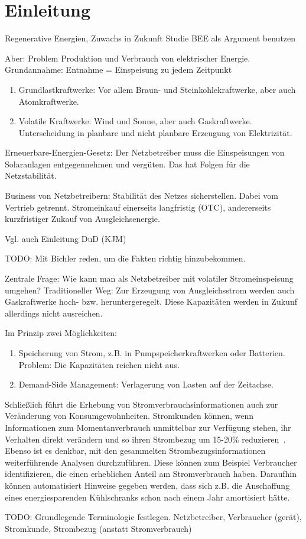 
\section{Einleitung}\label{sec:einleitung}

Regenerative Energien, Zuwachs in Zukunft
Studie BEE als Argument benutzen

Aber: Problem Produktion und Verbrauch von elektrischer Energie.
Grundannahme: Entnahme = Einspeisung zu jedem Zeitpunkt

\begin{enumerate}
  \item Grundlastkraftwerke: Vor allem Braun- und Steinkohlekraftwerke,
	aber auch Atomkraftwerke.
  \item Volatile Kraftwerke: Wind und Sonne, aber auch Gaskraftwerke.
	Unterscheidung in planbare und nicht planbare Erzeugung von
	Elektrizität.
\end{enumerate}

Erneuerbare-Energien-Gesetz: Der Netzbetreiber muss die Einspeisungen
von Solaranlagen entgegennehmen und vergüten. Das hat Folgen für
die Netzstabilität.

Business von Netzbetreibern: Stabilität des Netzes sicherstellen. Dabei
vom Vertrieb getrennt. Stromeinkauf einerseits langfristig (OTC),
andererseits kurzfristiger Zukauf von Ausgleichsenergie.

Vgl. auch Einleitung DuD (KJM)

TODO: Mit Bichler reden, um die Fakten richtig hinzubekommen.

Zentrale Frage: Wie kann man als Netzbetreiber mit volatiler Stromeinspeisung umgehen?
Traditioneller Weg: Zur Erzeugung von Ausgleichsstrom werden auch
Gaskraftwerke hoch- bzw. heruntergeregelt. Diese Kapazitäten werden in
Zukunf allerdings nicht ausreichen.

Im Prinzip zwei Möglichkeiten:
\begin{enumerate}
  \item Speicherung von Strom, z.B. in Pumpspeicherkraftwerken oder
	Batterien. Problem: Die Kapazitäten reichen nicht aus. 
  \item Demand-Side Management: Verlagerung von Lasten auf der
	Zeitachse.
\end{enumerate}

Schließlich führt die Erhebung von Stromverbrauchsinformationen auch zur
Veränderung von Konsumgewohnheiten. Stromkunden können, wenn
Informationen zum Momentanverbrauch unmittelbar zur Verfügung stehen,
ihr Verhalten direkt verändern und so ihren Strombezug um 15-20\%
reduzieren~\cite{geller2010smartgrid}. Ebenso ist es denkbar, mit den
gesammelten Strombezugsinformationen weiterführende Analysen
durchzuführen. Diese können zum Beispiel Verbraucher identifizieren, die
einen erheblichen Anteil am Stromverbrauch haben. Daraufhin können
automatisiert Hinweise gegeben werden, dass sich z.B. die Anschaffung
eines energiesparenden Kühlschranks schon nach einem Jahr amortisiert
hätte.


TODO: Grundlegende Terminologie festlegen.
Netzbetreiber, Verbraucher (gerät), Stromkunde, Strombezug (anstatt
Stromverbrauch)
